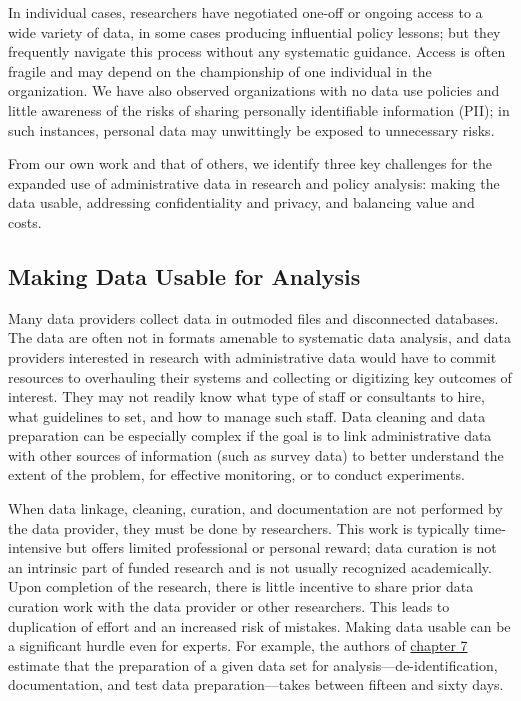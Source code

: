In individual cases, researchers have negotiated one-off or ongoing access to a wide variety of data, in some cases producing influential policy lessons; but they frequently navigate this process without any systematic guidance. Access is often fragile and may depend on the championship of one individual in the organization. We have also observed organizations with no data use policies and little awareness of the risks of sharing personally identifiable information (PII); in such instances, personal data may unwittingly be exposed to unnecessary risks.

From our own work and that of others, we identify three key challenges for the expanded use of administrative data in research and policy analysis: making the data usable, addressing confidentiality and privacy, and balancing value and costs.

\hypertarget{making-data-usable-for-analysis}{%
\subsection{Making Data Usable for Analysis}\label{making-data-usable-for-analysis}}

Many data providers collect data in outmoded files and disconnected databases. The data are often not in formats amenable to systematic data analysis, and data providers interested in research with administrative data would have to commit resources to overhauling their systems and collecting or digitizing key outcomes of interest. They may not readily know what type of staff or consultants to hire, what guidelines to set, and how to manage such staff. Data cleaning and data preparation can be especially complex if the goal is to link administrative data with other sources of information (such as survey data) to better understand the extent of the problem, for effective monitoring, or to conduct experiments.

When data linkage, cleaning, curation, and documentation are not performed by the data provider, they must be done by researchers. This work is typically time-intensive but offers limited professional or personal reward; data curation is not an intrinsic part of funded research and is not usually recognized academically. Upon completion of the research, there is little incentive to share prior data curation work with the data provider or other researchers. This leads to duplication of effort and an increased risk of mistakes. Making data usable can be a significant hurdle even for experts. For example, the authors of \protect\hyperlink{iab}{chapter 7} estimate that the preparation of a given data set for analysis---de-identification, documentation, and test data preparation---takes between fifteen and sixty days.

